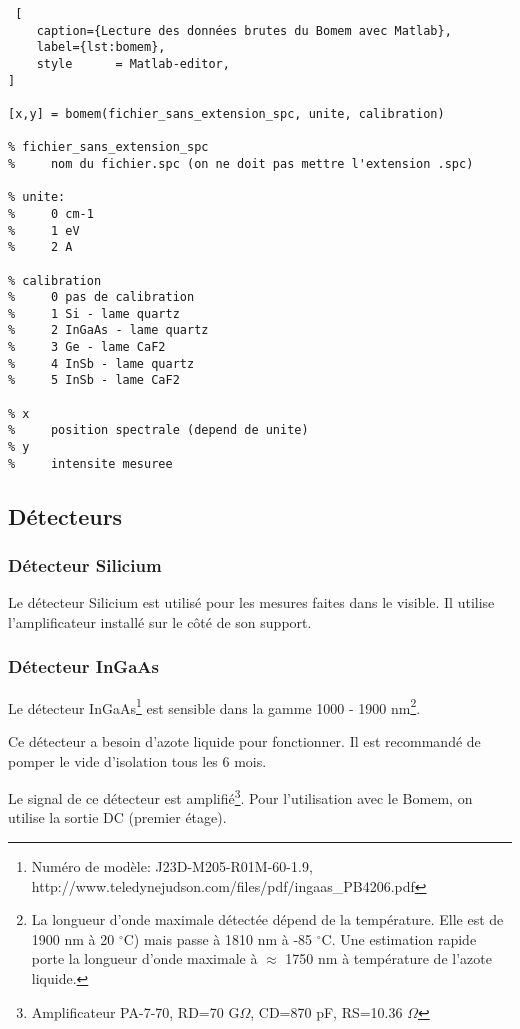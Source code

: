 \documentclass[11pt,francais]{book} %
\begin{document}
\begin{lstlisting} [
    caption={Lecture des données brutes du Bomem avec Matlab},
    label={lst:bomem},
    style      = Matlab-editor,
]

[x,y] = bomem(fichier_sans_extension_spc, unite, calibration)

% fichier_sans_extension_spc
%     nom du fichier.spc (on ne doit pas mettre l'extension .spc)

% unite: 
%     0	cm-1
%     1	eV
%     2	A

% calibration
%     0	pas de calibration
%     1	Si - lame quartz
%     2	InGaAs - lame quartz
%     3	Ge - lame CaF2
%     4	InSb - lame quartz
%     5	InSb - lame CaF2

% x
%     position spectrale (depend de unite)
% y
%     intensite mesuree

\end{lstlisting}

\subsection{Détecteurs}

\subsubsection{Détecteur Silicium}

Le détecteur Silicium est utilisé pour les mesures faites dans le visible.
Il utilise l'amplificateur installé sur le côté de son support.

\subsubsection{Détecteur InGaAs}

Le détecteur InGaAs\footnote{Numéro de modèle: J23D-M205-R01M-60-1.9, http://www.teledynejudson.com/files/pdf/ingaas\_PB4206.pdf} est sensible dans la gamme 1000 - 1900 nm\footnote{La longueur d'onde maximale détectée dépend de la température. Elle est de 1900 nm à 20 $^{\circ}$C) mais passe à 1810 nm à -85 $^{\circ}$C. Une estimation rapide porte la longueur d'onde maximale à $\approx$ 1750 nm à température de l'azote liquide.}.

Ce détecteur a besoin d'azote liquide pour fonctionner.
Il est recommandé de pomper le vide d'isolation tous les 6 mois.

Le signal de ce détecteur est amplifié\footnote{Amplificateur PA-7-70, RD=70 G$\Omega$, CD=870 pF, RS=10.36 $\Omega$}.
Pour l'utilisation avec le Bomem, on utilise la sortie DC (premier étage).
\end{document}
